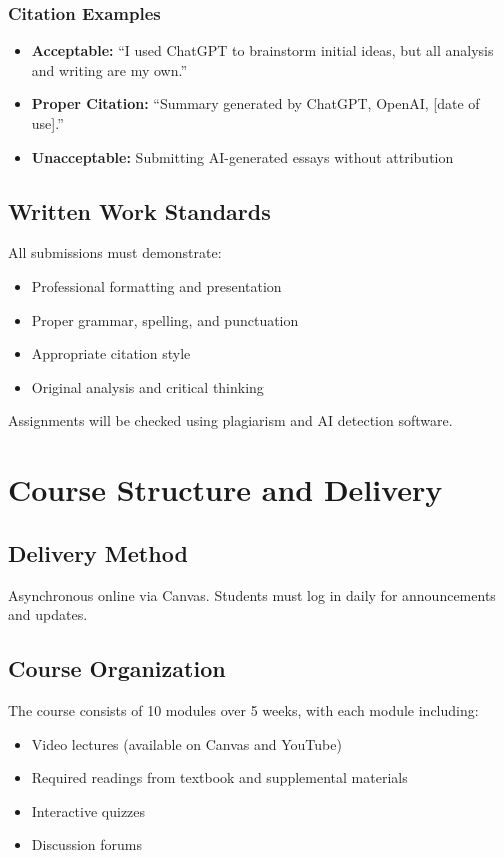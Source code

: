 \documentclass[11pt]{scrartcl} %
\begin{document}
\subsubsection{Citation Examples}
\begin{itemize}
\item \textbf{Acceptable:} ``I used ChatGPT to brainstorm initial ideas, but all analysis and writing are my own.''
\item \textbf{Proper Citation:} ``Summary generated by ChatGPT, OpenAI, [date of use].''
\item \textbf{Unacceptable:} Submitting AI-generated essays without attribution
\end{itemize}

\subsection{Written Work Standards}
All submissions must demonstrate:
\begin{itemize}
\item Professional formatting and presentation
\item Proper grammar, spelling, and punctuation
\item Appropriate citation style
\item Original analysis and critical thinking
\end{itemize}

Assignments will be checked using plagiarism and AI detection software.

\section{Course Structure and Delivery}

\subsection{Delivery Method}
Asynchronous online via Canvas. Students must log in daily for announcements and updates.

\subsection{Course Organization}
The course consists of 10 modules over 5 weeks, with each module including:
\begin{itemize}
\item Video lectures (available on Canvas and YouTube)
\item Required readings from textbook and supplemental materials
\item Interactive quizzes
\item Discussion forums
\end{itemize}
\end{document}
